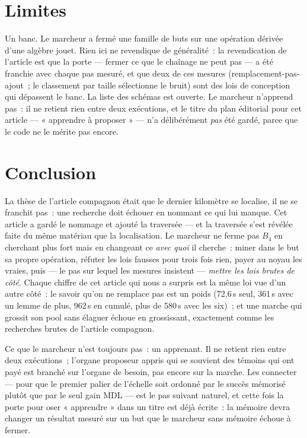 \documentclass[11pt]{article}
\theoremstyle{remark}\newtheorem{remarque}{Remarque}
\begin{document}
\section{Limites}
\label{sec:limitations}

Un banc. Le marcheur a fermé une famille de buts sur une opération dérivée
d'une algèbre jouet. Rien ici ne revendique de généralité~: la revendication
de l'article est que la porte --- fermer ce que le chaînage ne peut pas ---
a été franchie avec chaque pas mesuré, et que deux de ces mesures
(remplacement-pas-ajout~; le classement par taille sélectionne le bruit) sont
des lois de conception qui dépassent le banc. La liste des schémas est
ouverte. Le marcheur n'apprend pas~: il ne retient rien entre deux
exécutions, et le titre du plan éditorial pour cet article --- « apprendre à
proposer » --- n'a délibérément \emph{pas} été gardé, parce que le code ne le
mérite pas encore.

\section{Conclusion}
\label{sec:conclusion}

La thèse de l'article compagnon était que le dernier kilomètre se localise,
il ne se franchit pas~: une recherche doit échouer en nommant ce qui lui
manque. Cet article a gardé le nommage et ajouté la traversée --- et la
traversée s'est révélée faite du même matériau que la localisation. Le
marcheur ne ferme pas $B_4$ en cherchant plus fort mais en changeant ce
\emph{avec quoi} il cherche~: miner dans le but sa propre opération, réfuter
les lois fausses pour trois fois rien, payer au noyau les vraies, puis ---
le pas sur lequel les mesures insistent --- \emph{mettre les lois brutes de
côté}. Chaque chiffre de cet article qui nous a surpris est la même loi vue
d'un autre côté~: le savoir qu'on ne remplace pas est un poids (72,6\,s
seul, 361\,s avec un lemme de plus, 962\,s en cumulé, plus de 580\,s avec
les six)~; et une marche qui grossit son pool sans élaguer échoue en
grossissant, exactement comme les recherches brutes de l'article compagnon.

Ce que le marcheur n'est toujours pas~: un apprenant. Il ne retient rien
entre deux exécutions~; l'organe proposeur appris qui se souvient des témoins
qui ont payé est branché sur l'organe de besoin, pas encore sur la marche.
Les connecter --- pour que le premier palier de l'échelle soit ordonné par le
succès mémorisé plutôt que par le seul gain MDL --- est le pas suivant
naturel, et cette fois la porte pour oser « apprendre » dans un titre est
déjà écrite~: la mémoire devra changer un résultat mesuré sur un but que le
marcheur sans mémoire échoue à fermer.



\end{document}
